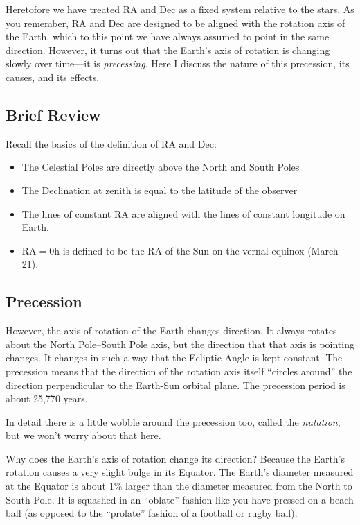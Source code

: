 \documentclass[12pt, preprint]{aastex}
\begin{document}
Heretofore we have treated RA and Dec as a fixed system relative to
the stars. As you remember, RA and Dec are designed to be aligned with
the rotation axis of the Earth, which to this point we have always
assumed to point in the same direction. However, it turns out that the
Earth's axis of rotation is changing slowly over time---it is {\it
  precessing}. Here I discuss the nature of this precession, its
causes, and its effects.

\subsection{Brief Review}

Recall the basics of the definition of RA and Dec:
\begin{itemize}
\item The Celestial Poles are directly above the North and South Poles
\item The Declination at zenith is equal to the latitude of the
  observer
\item The lines of constant RA  are aligned with the lines of constant
  longitude on Earth.
\item RA$=$0h is defined to be the RA of the Sun on the vernal equinox
  (March 21).
\end{itemize}

\subsection{Precession}

However, the axis of rotation of the Earth changes direction. It
always rotates about the North Pole--South Pole axis, but the
direction that that axis is pointing changes.  It changes in such a
way that the Ecliptic Angle is kept constant. The precession means
that the direction of the rotation axis itself ``circles around'' the
direction perpendicular to the Earth-Sun orbital plane.
The precession period is about 25,770 years. 

In detail there is a little wobble around the precession too, called
the {\it nutation}, but we won't worry about that here.

Why does the Earth's axis of rotation change its direction? Because
the Earth's rotation causes a very slight bulge in its Equator. The
Earth's diameter measured at the Equator is about 1\% larger than the
diameter measured from the North to South Pole. It is squashed in an
``oblate'' fashion like you have pressed on a beach ball (as opposed
to the ``prolate'' fashion of a football or rugby ball).
\end{document}
